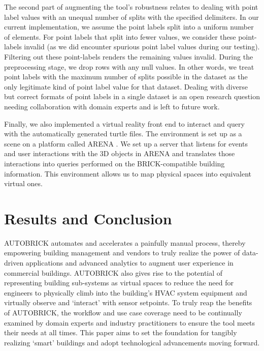 \documentclass[twocolumn, switch]{article} %
\begin{document}
	The second part of augmenting the tool’s robustness relates to dealing with point label values with an unequal number of splits with the specified delimiters. In our current implementation, we assume the point labels split into a uniform number of elements. For point labels that split into fewer values, we consider these point-labels invalid (as we did encounter spurious point label values during our testing). Filtering out these point-labels renders the remaining values invalid. During the preprocessing stage, we drop rows with any null values. In other words, we treat point labels with the maximum number of splits possible in the dataset as the only legitimate kind of point label value for that dataset. Dealing with diverse but correct formats of point labels in a single dataset is an open research question needing collaboration with domain experts and is left to future work.

Finally, we also implemented a virtual reality front end to interact and
query with the automatically generated turtle files. The environment is set up
as a scene on a platform called ARENA \cite{conix-center}. We set up a server that listens for
events and user interactions with the 3D objects in ARENA and translates those
interactions into queries performed on the BRICK-compatible building
information. This environment allows us to map physical spaces into equivalent virtual ones.

\section{Results and Conclusion}
AUTOBRICK automates and accelerates a painfully manual process, thereby
empowering building management and vendors to truly realize the power of
data-driven applications and advanced analytics to augment user experience in
commercial buildings. AUTOBRICK also gives rise to the potential of
representing building sub-systems as virtual spaces to reduce the need for
engineers to physically climb into the building's HVAC system equipment and virtually observe and ‘interact’ with sensor setpoints. To truly reap the benefits of AUTOBRICK, the workflow and use case coverage need to be continually examined by domain experts and industry practitioners to ensure the tool meets their needs at all times. This paper aims to set the foundation for tangibly realizing ‘smart’ buildings and adopt technological advancements moving forward.

\end{document}
